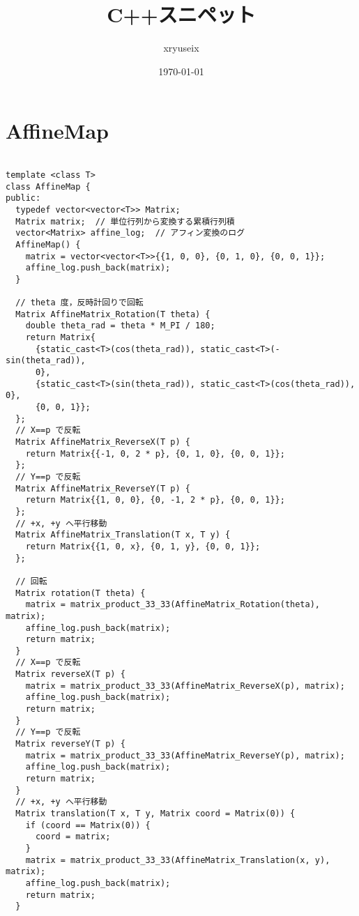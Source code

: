 \documentclass[a4j,titlepage]{jarticle} %
\title{C++スニペット}
\author{xryuseix}
\date{\today}
\begin{document}
\maketitle

\tableofcontents%
\clearpage



\color{white}
\section{AffineMap}
\color{black}
\begin{lstlisting}[caption=AffineMap]

template <class T>
class AffineMap {
public:
  typedef vector<vector<T>> Matrix;
  Matrix matrix;  // 単位行列から変換する累積行列積
  vector<Matrix> affine_log;  // アフィン変換のログ
  AffineMap() {
    matrix = vector<vector<T>>{{1, 0, 0}, {0, 1, 0}, {0, 0, 1}};
    affine_log.push_back(matrix);
  }

  // theta 度，反時計回りで回転
  Matrix AffineMatrix_Rotation(T theta) {
    double theta_rad = theta * M_PI / 180;
    return Matrix{
      {static_cast<T>(cos(theta_rad)), static_cast<T>(-sin(theta_rad)),
      0},
      {static_cast<T>(sin(theta_rad)), static_cast<T>(cos(theta_rad)), 0},
      {0, 0, 1}};
  };
  // X==p で反転
  Matrix AffineMatrix_ReverseX(T p) {
    return Matrix{{-1, 0, 2 * p}, {0, 1, 0}, {0, 0, 1}};
  };
  // Y==p で反転
  Matrix AffineMatrix_ReverseY(T p) {
    return Matrix{{1, 0, 0}, {0, -1, 2 * p}, {0, 0, 1}};
  };
  // +x, +y へ平行移動
  Matrix AffineMatrix_Translation(T x, T y) {
    return Matrix{{1, 0, x}, {0, 1, y}, {0, 0, 1}};
  };

  // 回転
  Matrix rotation(T theta) {
    matrix = matrix_product_33_33(AffineMatrix_Rotation(theta), matrix);
    affine_log.push_back(matrix);
    return matrix;
  }
  // X==p で反転
  Matrix reverseX(T p) {
    matrix = matrix_product_33_33(AffineMatrix_ReverseX(p), matrix);
    affine_log.push_back(matrix);
    return matrix;
  }
  // Y==p で反転
  Matrix reverseY(T p) {
    matrix = matrix_product_33_33(AffineMatrix_ReverseY(p), matrix);
    affine_log.push_back(matrix);
    return matrix;
  }
  // +x, +y へ平行移動
  Matrix translation(T x, T y, Matrix coord = Matrix(0)) {
    if (coord == Matrix(0)) {
      coord = matrix;
    }
    matrix = matrix_product_33_33(AffineMatrix_Translation(x, y), matrix);
    affine_log.push_back(matrix);
    return matrix;
  }


\end{lstlisting}
\end{document}
